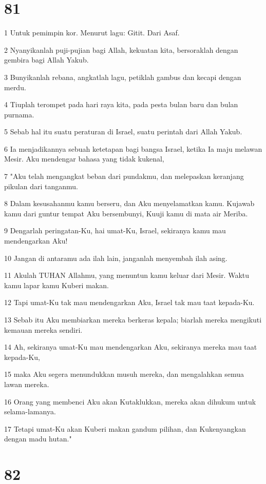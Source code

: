 \chapter{81}

\par 1 Untuk pemimpin kor. Menurut lagu: Gitit. Dari Asaf.
\par 2 Nyanyikanlah puji-pujian bagi Allah, kekuatan kita, bersoraklah dengan gembira bagi Allah Yakub.
\par 3 Bunyikanlah rebana, angkatlah lagu, petiklah gambus dan kecapi dengan merdu.
\par 4 Tiuplah terompet pada hari raya kita, pada pesta bulan baru dan bulan purnama.
\par 5 Sebab hal itu suatu peraturan di Israel, suatu perintah dari Allah Yakub.
\par 6 Ia menjadikannya sebuah ketetapan bagi bangsa Israel, ketika Ia maju melawan Mesir. Aku mendengar bahasa yang tidak kukenal,
\par 7 "Aku telah mengangkat beban dari pundakmu, dan melepaskan keranjang pikulan dari tanganmu.
\par 8 Dalam kesusahanmu kamu berseru, dan Aku menyelamatkan kamu. Kujawab kamu dari guntur tempat Aku bersembunyi, Kuuji kamu di mata air Meriba.
\par 9 Dengarlah peringatan-Ku, hai umat-Ku, Israel, sekiranya kamu mau mendengarkan Aku!
\par 10 Jangan di antaramu ada ilah lain, janganlah menyembah ilah asing.
\par 11 Akulah TUHAN Allahmu, yang menuntun kamu keluar dari Mesir. Waktu kamu lapar kamu Kuberi makan.
\par 12 Tapi umat-Ku tak mau mendengarkan Aku, Israel tak mau taat kepada-Ku.
\par 13 Sebab itu Aku membiarkan mereka berkeras kepala; biarlah mereka mengikuti kemauan mereka sendiri.
\par 14 Ah, sekiranya umat-Ku mau mendengarkan Aku, sekiranya mereka mau taat kepada-Ku,
\par 15 maka Aku segera menundukkan musuh mereka, dan mengalahkan semua lawan mereka.
\par 16 Orang yang membenci Aku akan Kutaklukkan, mereka akan dihukum untuk selama-lamanya.
\par 17 Tetapi umat-Ku akan Kuberi makan gandum pilihan, dan Kukenyangkan dengan madu hutan."

\chapter{82}

